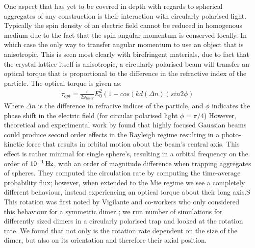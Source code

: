 One aspect that has yet to be covered in depth with regards to
spherical aggregates of any construction is their interaction with
circularly polarised light. Typically the spin density of an electric
field cannot be reduced in homogenous medium due to the fact that the
spin angular momentum is conserved locally. In which case the only way
to transfer angular momentum to use an object that is anisotropic.
This is seen most clearly with birefringent materials, due to fact that
the crystal lattice itself is anisotropic, a circularly polarised beam
will transfer an optical torque that is proportional to the difference in 
the refractive index of the particle. The optical torque is given as:
\begin{equation}
	\label{eq:opt_torque}
	\begin{aligned}
		\tau_{opt} = \frac{\epsilon}{2\omega_{laser}}E_0^2 (1-cos(kd(\Delta n))sin2\phi)
	\end{aligned}
\end{equation}
Where $\Delta n$ is the difference in refracive indices of the 
particle, and $\phi$ indicates the phase shift in the electric field
(for circular polarised light $\phi= \pi/4$) However, theoretical and
experimental work by \cite{Yevick2017} found that highly focused
Gaussian beams could produce second order effects in the Rayleigh
regime resulting in a photo-kinetic force that results in orbital
motion about the beam's central axis. This effect is rather minimal
for single sphere's, resulting in a orbital frequency on the order of
$10^{-1}\,{\rm Hz}$, with an order of magnitude difference when
trapping aggregates of spheres.  They computed the circulation rate by
computing the time-average probability flux; however, when extended to
the Mie regime we see a completely different behaviour, instead
experiencing an optical torque about their long axis.S This rotation
was first noted by Vigilante and co-workers who only considered this
behaviour for a symmetric dimer \cite{Vigilante2020}; we run number of
simulations for differently sized dimers in a circularly polarised
trap and looked at the rotation rate.  We found that not only is the
rotation rate dependent on the size of the dimer, but also on its
orientation and therefore their axial position.

